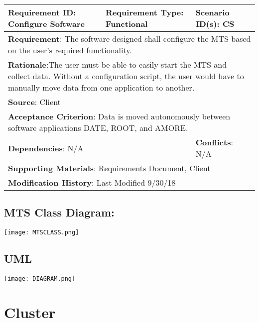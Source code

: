 \documentclass[12pt]{article}
\begin{document}
\begin{tabular}{|p{5 cm}|p{5 cm}|p{5 cm}|}
	\hline
	\textbf{Requirement ID}: \newline Configure Software & \textbf{Requirement Type}: \newline Functional & \textbf{Scenario ID(s)}: \newline CS 
	\\\hline
	\multicolumn{3}{|p{15cm}|}{\textbf{Requirement}: The software designed shall configure the MTS based on the user’s required functionality.}
	\\\hline
	\multicolumn{3}{|p{15cm}|}{\textbf{Rationale}:The user must be able to easily start the MTS and collect data. Without a configuration script, the user would have to manually move data from one application to another.}
	\\\hline
	\multicolumn{3}{|p{15cm}|}{\textbf{Source}: Client}
	\\\hline
	\multicolumn{3}{|p{15cm}|}{\textbf{Acceptance Criterion}: Data is moved autonomously between software applications DATE, ROOT, and AMORE.}
	\\\hline
	\multicolumn{2}{|p{10cm}|}{\textbf{Dependencies}: N/A} &
	\textbf{Conflicts}: N/A
	\\\hline
	\multicolumn{3}{|p{15cm}|}{\textbf{Supporting Materials}: Requirements Document, Client}
	\\\hline
	\multicolumn{3}{|p{15cm}|}{\textbf{Modification History}: Last Modified 9/30/18}
	\\\hline
\end{tabular}

\newpage
\subsection*{MTS Class Diagram:} 
%
\texttt{[image: MTSCLASS.png]}
\newline \\
\subsection*{UML}
%
\texttt{[image: DIAGRAM.png]}


\section*{Cluster}
%
\end{document}
